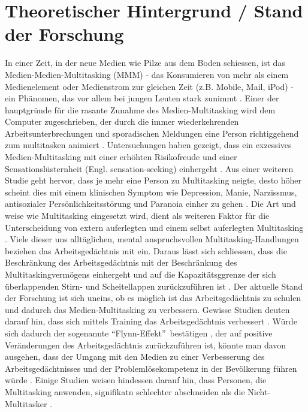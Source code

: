 \section*{Theoretischer Hintergrund / Stand der Forschung}\label{section.forschung}
In einer Zeit, in der neue Medien wie Pilze aus dem Boden schiessen, ist das Medien-Medien-Multitasking (MMM) - das Konsumieren von mehr als einem Medienelement oder Medienstrom zur gleichen Zeit (z.B. Mobile, Mail, iPod) - ein Phänomen, das vor allem bei jungen Leuten stark zunimmt \cite{Rideout2010}. Einer der hauptgründe für die rasante Zunahme des Medien-Multitasking wird dem Computer zugeschrieben, der durch die immer wiederkehrenden Arbeitsunterbrechungen und sporadischen Meldungen eine  Person richtiggehend zum multitasken animiert \cite{Foehr2006}.  Untersuchungen haben gezeigt, dass ein exzessives Medien-Multitasking mit einer erhöhten Risikofreude und einer Sensationslüsternheit (Engl. sensation-seeking) einhergeht \cite{Foehr2006}. Aus einer weiteren Studie geht hervor, dass je mehr eine Person zu Multitasking neigte, desto höher scheint dies mit einem klinischen Symptom wie Depression, Manie, Narzissmus, antisozialer Persönlichkeitsstörung und Paranoia einher zu gehen \cite{Rosen2013}. Die Art und weise wie Multitasking eingesetzt wird, dient als weiteren Faktor für die Unterscheidung von extern auferlegten und einem selbst auferlegten Multitasking \cite{Shih2013}. Viele dieser uns alltäglichen, mental anspruchsvollen Multitasking-Handlungen beziehen das Arbeitsgedächtnis mit ein. Daraus lässt sich schliessen, dass die Beschränkung des Arbeitsgedächtnis mit der Beschränkung des Multitaskingvermögens einhergeht und auf die Kapazitätsggrenze der sich überlappenden Stirn- und Scheitellappen zurückzuführen ist \cite{Klingberg2008}. Der aktuelle Stand der Forschung ist sich uneins, ob es möglich ist das Arbeitsgedächtnis zu schulen und dadurch das Medien-Multitasking zu verbessern. Gewisse Studien deuten darauf hin, dass sich mittels Training das Arbeitsgedächtnis verbessert \cite{Hernstein1986, Feuerstein1985, Stankov1986}. Würde sich dadurch der sogenannte \textquotedblleft Flynn-Effekt\textquotedblright \ bestätigen \cite{Flynn1987}, der auf positive Veränderungen des Arbeitsgedächtnis zurückzuführen ist, könnte man davon ausgehen, dass der Umgang mit den Medien zu einer Verbesserung des Arbeitsgedächtnisses und der Problemlösekompetenz in der Bevölkerung führen würde \cite{Klingberg2008}. Einige Studien weisen hindessen darauf hin, dass Personen, die Multitasking anwenden, signifikatn schlechter abschneiden als die Nicht-Multitasker \cite{Spitzer2012}.\\


